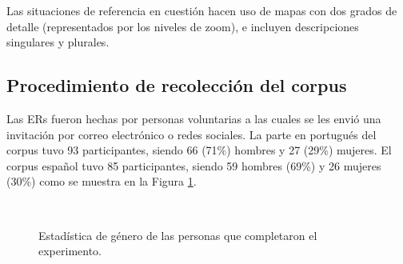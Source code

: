Las situaciones de referencia en cuesti\'on hacen uso de mapas con dos grados de detalle (representados por los niveles de zoom), e incluyen descripciones singulares y plurales.



\subsection{Procedimiento de recolecci\'on del corpus}
\label{corpus-voluntarios}

Las ERs fueron hechas por personas voluntarias a las cuales se les envi\'o una invitaci\'on por correo electr\'onico o redes sociales. La parte en portugu\'es del corpus tuvo 93 participantes, siendo 66 (71\%) hombres y 27 (29\%) mujeres. El corpus espa\~nol tuvo 85 participantes, siendo 59 hombres (69\%) y 26 mujeres (30\%) como se muestra en la Figura \ref{estadistica-mf}.
\begin{figure}[ht]
\begin{center}
\\[0pt]
\caption{Estad\'istica de g\'enero de las personas que completaron el experimento.}
\label{estadistica-mf}
\end{center}
\end{figure}

